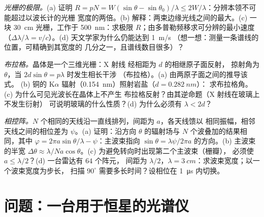 \begin{exercise}[$\star\star\star$]\label{exo:b2:gratings:10}
\emph{光栅的极限。}(a) 证明 $R = pN = W(\sin\theta - \sin\theta_0)
/\lambda \le 2W/\lambda$：分辨本领不可能超过以波长计的光栅
宽度的两倍。(b) 解释：两束边缘光线之间的最大。(c) 一块
\qty{30}{cm} 光栅，工作于
\qty{500}{nm}：求极限 $R$；由多普勒频移求可分辨的最小速度
（$\Delta\lambda/\lambda = v/c$）。(d) 天文学家为什么仍能达到 \qty{1}{m/s}
（想一想：测量一条谱线的位置，可精确到其宽度的
几分之一，且谱线数目很多）？
\end{exercise}

\begin{exercise}[$\star\star\star$]\label{exo:b2:gratings:11}
\emph{布拉格。}晶体是一个三维光栅：X 射线
经相距为 $d$ 的相继原子面反射，
掠射角为 $\theta$，当 $2d\sin\theta = p\lambda$ 时发生相长干涉
（布拉格）。(a) 由两原子面之间的推导该式。
(b) 铜的 K$\alpha$ 辐射（\qty{0.154}{nm}）照射岩盐（$d = \qty{0.282}{nm}$）：
求布拉格角。(c) 为什么可见光波长在晶体上不产生
布拉格反射？由其逆命题（X 射线在玻璃上不发生衍射）
可说明玻璃的什么性质？(d) 为什么必须有 $\lambda < 2d$？
\end{exercise}

\begin{exercise}[$\star\star\star$]\label{exo:b2:gratings:12}
\emph{相控阵。}$N$ 个相同的天线沿一直线排列，间距为 $a$，各天线馈以
相同振幅，相邻天线之间的相位差为 $\psi$。(a)
证明：沿方向 $\theta$ 的辐射场与
$N$ 个波叠加的结果相同，其中 $\varphi = 2\pi a\sin\theta/\lambda - \psi$：主波束指向
$\sin\theta = \lambda\psi/2\pi a$ 的方向。(b) 主波束的半宽 $\Delta\theta
\approx \lambda/Na\cos\theta$。(c) 为避免转向时出现第二个主波束（栅瓣），
必须使 $a \le \lambda/2$？(d) 一台雷达有 $64$ 个阵元，
间距为 $\lambda/2$，$\lambda = \qty{3}{cm}$：求波束宽度；以一个波束宽度为步长，
扫描 $90^\circ$ 需要多长时间？设相位在 \qty{1}{\micro s} 内切换。
\end{exercise}

\section{问题：一台用于恒星的光谱仪}

